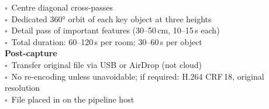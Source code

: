 \begin{center}
{\begin{minipage}{0.92\textwidth}
$\square$\ Centre diagonal cross-passes\\
$\square$\ Dedicated 360° orbit of each key object at three heights\\
$\square$\ Detail pass of important features (30--50\,cm, 10--15\,s each)\\
$\square$\ Total duration: 60--120\,s per room; 30--60\,s per object\\[6pt]
\textbf{Post-capture}\\[2pt]
$\square$\ Transfer original file via USB or AirDrop (not cloud)\\
$\square$\ No re-encoding unless unavoidable; if required: H.264 CRF\,18, original resolution\\
$\square$\ File placed in  on the pipeline host\\
\end{minipage}}
\end{center}
